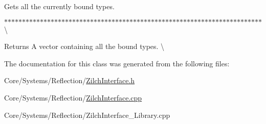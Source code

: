 Gets all the currently bound types. 

$\ast$$\ast$$\ast$$\ast$$\ast$$\ast$$\ast$$\ast$$\ast$$\ast$$\ast$$\ast$$\ast$$\ast$$\ast$$\ast$$\ast$$\ast$$\ast$$\ast$$\ast$$\ast$$\ast$$\ast$$\ast$$\ast$$\ast$$\ast$$\ast$$\ast$$\ast$$\ast$$\ast$$\ast$$\ast$$\ast$$\ast$$\ast$$\ast$$\ast$$\ast$$\ast$$\ast$$\ast$$\ast$$\ast$$\ast$$\ast$$\ast$$\ast$$\ast$$\ast$$\ast$$\ast$$\ast$$\ast$$\ast$$\ast$$\ast$$\ast$$\ast$$\ast$$\ast$$\ast$$\ast$$\ast$$\ast$$\ast$$\ast$$\ast$$\ast$$\ast$\textbackslash{} \begin{DoxyReturn}{Returns}
A vector containing all the bound types. \textbackslash{} 
\end{DoxyReturn}


The documentation for this class was generated from the following files\-:\begin{DoxyCompactItemize}
\item 
Core/\-Systems/\-Reflection/\hyperlink{ZilchInterface_8h}{Zilch\-Interface.\-h}\item 
Core/\-Systems/\-Reflection/\hyperlink{ZilchInterface_8cpp}{Zilch\-Interface.\-cpp}\item 
Core/\-Systems/\-Reflection/Zilch\-Interface\-\_\-\-Library.\-cpp\end{DoxyCompactItemize}
